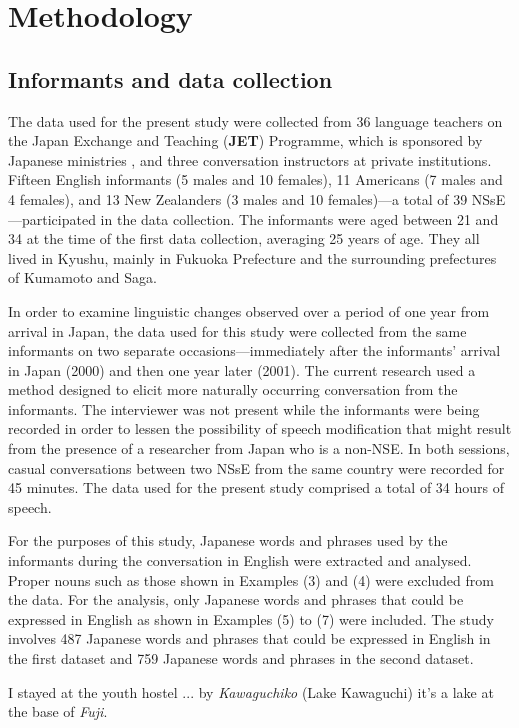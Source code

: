 \documentclass[output=paper]{LSP/langsci}
\begin{document}
\section{Methodology}
\subsection{Informants and data collection}
The data used for the present study were collected from 36 language teachers on the Japan Exchange and Teaching (\textbf{JET}) Programme, which is sponsored by Japanese ministries \citep{council_of_local_authorities_for_international_relations_[clair]_jet_2013}, and three conversation instructors at private institutions. Fifteen English informants (5 males and 10 females), 11 Americans (7 males and 4 females), and 13 New Zealanders (3 males and 10 females)—a total of 39 NSsE—participated in the data collection. The informants were aged between 21 and 34 at the time of the first data collection, averaging 25 years of age. They all lived in Kyushu, mainly in Fukuoka Prefecture and the surrounding prefectures of Kumamoto and Saga.

In order to examine linguistic changes observed over a period of one year from arrival in Japan, the data used for this study were collected from the same informants on two separate occasions—immediately after the informants’ arrival in Japan (2000) and then one year later (2001). The current research used a method designed to elicit more naturally occurring conversation from the informants. The interviewer was not present while the informants were being recorded in order to lessen the possibility of speech modification that might result from the presence of a researcher from Japan who is a non-NSE. In both sessions, casual conversations between two NSsE from the same country were recorded for 45 minutes. The data used for the present study comprised a total of 34 hours of speech.

For the purposes of this study, Japanese words and phrases used by the informants during the conversation in English were extracted and analysed. Proper nouns such as those shown in Examples (3) and (4) were excluded from the data. For the analysis, only Japanese words and phrases that could be expressed in English as shown in Examples (5) to (7) were included. The study involves 487 Japanese words and phrases that could be expressed in English in the first dataset and 759 Japanese words and phrases in the second dataset.

\begin{exe}
\label{ex:3}
\ex I stayed at the youth hostel ... by \textit{Kawaguchiko} (Lake Kawaguchi) it's a lake at the base of \textit{Fuji}.
\end{exe}
\end{document}
